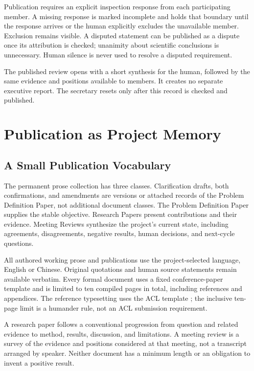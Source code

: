 \documentclass[11pt]{article}
\begin{document}
Publication requires an explicit inspection response from each participating member. A missing response is marked incomplete and holds that boundary until the response arrives or the human explicitly excludes the unavailable member. Exclusion remains visible. A disputed statement can be published as a dispute once its attribution is checked; unanimity about scientific conclusions is unnecessary. Human silence is never used to resolve a disputed requirement.

The published review opens with a short synthesis for the human, followed by the same evidence and positions available to members. It creates no separate executive report. The secretary resets only after this record is checked and published.

\section{Publication as Project Memory}

\subsection{A Small Publication Vocabulary}

The permanent prose collection has three classes. Clarification drafts, both confirmations, and amendments are versions or attached records of the Problem Definition Paper, not additional document classes. The Problem Definition Paper supplies the stable objective. Research Papers present contributions and their evidence. Meeting Reviews synthesize the project's current state, including agreements, disagreements, negative results, human decisions, and next-cycle questions.

All authored working prose and publications use the project-selected language, English or Chinese. Original quotations and human source statements remain available verbatim. Every formal document uses a fixed conference-paper template and is limited to ten compiled pages in total, including references and appendices. The reference typesetting uses the ACL template \citep{aclstyle}; the inclusive ten-page limit is a humander rule, not an ACL submission requirement.

A research paper follows a conventional progression from question and related evidence to method, results, discussion, and limitations. A meeting review is a survey of the evidence and positions considered at that meeting, not a transcript arranged by speaker. Neither document has a minimum length or an obligation to invent a positive result.
\end{document}
